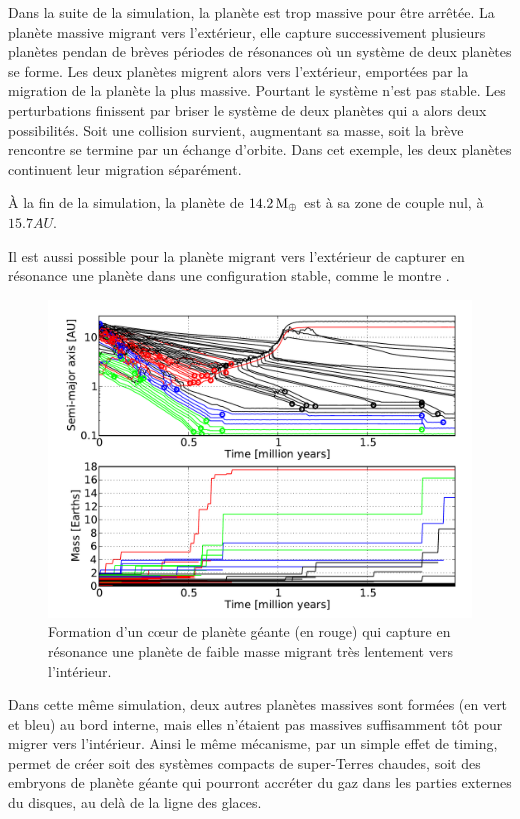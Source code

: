 Dans la suite de la simulation, la planète est trop massive pour être arrêtée. La planète massive migrant vers l'extérieur, elle capture successivement plusieurs planètes pendan de brèves périodes de résonances où un système de deux planètes se forme. Les deux planètes migrent alors vers l'extérieur, emportées par la migration de la planète la plus massive. Pourtant le système n'est pas stable. Les perturbations finissent par briser le système de deux planètes qui a alors deux possibilités. Soit une collision survient, augmentant sa masse, soit la brève rencontre se termine par un échange d'orbite. Dans cet exemple, les deux planètes continuent leur migration séparément.

À la fin de la simulation, la planète de $14.2\mathrm{\thinspace M_\oplus}$ est à sa zone de couple nul, à $15.7\unit{AU}$. 

\bigskip

Il est aussi possible pour la planète migrant vers l'extérieur de capturer en résonance une planète dans une configuration stable, comme le montre .
\begin{figure}[htbp]
\centering
\includegraphics[width=0.65\linewidth]{figure/HSE/2-body_outward.pdf}
\caption{Formation d'un cœur de planète géante (en rouge) qui capture en résonance une planète de faible masse migrant très lentement vers l'intérieur.}\label{fig:2-body_outward}%
\end{figure}

Dans cette même simulation, deux autres planètes massives sont formées (en vert et bleu) au bord interne, mais elles n'étaient pas massives suffisamment tôt pour migrer vers l'intérieur. Ainsi le même mécanisme, par un simple effet de timing, permet de créer soit des systèmes compacts de super-Terres chaudes, soit des embryons de planète géante qui pourront accréter du gaz dans les parties externes du disques, au delà de la ligne des glaces.

